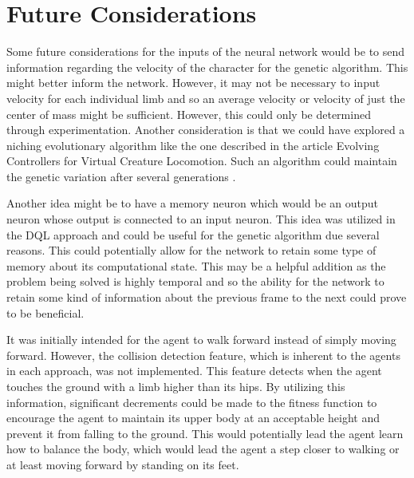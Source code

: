 \documentclass[letterpaper]{article} %
\begin{document}
\section{Future Considerations}

Some future considerations for the inputs of the neural network would be to send information regarding the velocity of the character for the genetic algorithm. This might better inform the network. However, it may not be necessary to input velocity for each individual limb and so an average velocity or velocity of just the center of mass might be sufficient. However, this could only be determined through experimentation. Another consideration is that we could have explored a niching evolutionary algorithm like the one described in the article Evolving Controllers for Virtual Creature Locomotion. Such an algorithm could maintain the genetic variation after several generations \cite{sanders_lobb_riddle_2003}.  

\par Another idea might be to have a memory neuron which would be an output neuron whose output is connected to an input neuron. This idea was utilized in the DQL approach and could be useful for the genetic algorithm due several reasons. This could potentially allow for the network to retain some type of memory about its computational state. This may be a helpful addition as the problem being solved is highly temporal and so the ability for the network to retain some kind of information about the previous frame to the next could prove to be beneficial. 

\par It was initially intended for the agent to walk forward instead of simply moving forward. However, the collision detection feature, which is inherent to the agents in each approach, was not implemented. This feature detects when the agent touches the ground with a limb higher than its hips. By utilizing this information, significant decrements could be made to the fitness function to encourage the agent to maintain its upper body at an acceptable height and prevent it from falling to the ground. This would potentially lead the agent learn how to balance the body, which would lead the agent a step closer to walking or at least moving forward by standing on its feet.
\end{document}
